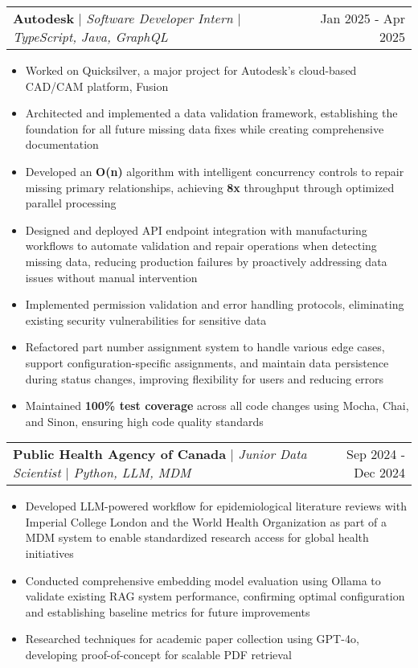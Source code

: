 \documentclass[letterpaper,10pt]{article}
\makeatletter
\newcommand{\resumeItem}[1]{
  \item\small{
    {#1 \vspace{-3.5pt}}
  }
}
\newcommand{\resumeSubheading}[3]{
    \item
    \begin{tabular*}{0.97\textwidth}[t]{l@{\extracolsep{\fill}}r}
      \textbf{#1} $|$ \textit{ #2} & #3 \\
    \end{tabular*}\vspace{-6pt}
}
\newcommand{\resumeItemListStart}{\begin{itemize}}
\newcommand{\resumeItemListEnd}{\end{itemize}\vspace{-5pt}}
\makeatother
\begin{document}
    \resumeSubheading{Autodesk}{Software Developer Intern $|$ TypeScript, Java, GraphQL}{Jan 2025 - Apr 2025}
        \resumeItemListStart
            \resumeItem{Worked on Quicksilver, a major project for Autodesk's cloud-based CAD/CAM platform, Fusion}
            \resumeItem{Architected and implemented a data validation framework, establishing the foundation for all future missing data fixes while creating comprehensive documentation}
            \resumeItem{Developed an \textbf{O(n)} algorithm with intelligent concurrency controls to repair missing primary relationships, achieving \textbf{8x} throughput through optimized parallel processing}
            \resumeItem{Designed and deployed API endpoint integration with manufacturing workflows to automate validation and repair operations when detecting missing data, reducing production failures by proactively addressing data issues without manual intervention}
            \resumeItem{Implemented permission validation and error handling protocols, eliminating existing security vulnerabilities for sensitive data}
            \resumeItem{Refactored part number assignment system to handle various edge cases, support configuration-specific assignments, and maintain data persistence during status changes, improving flexibility for users and reducing errors}
            \resumeItem{Maintained \textbf{100\% test coverage} across all code changes using Mocha, Chai, and Sinon, ensuring high code quality standards}
        \resumeItemListEnd

    \resumeSubheading{Public Health Agency of Canada}{Junior Data Scientist $|$ Python, LLM, MDM}{Sep 2024 - Dec 2024}
      \resumeItemListStart
        \resumeItem{Developed LLM-powered workflow for epidemiological literature reviews with Imperial College London and the World Health Organization as part of a MDM system to enable standardized research access for global health initiatives}
        \resumeItem{Conducted comprehensive embedding model evaluation using Ollama to validate existing RAG system performance, confirming optimal configuration and establishing baseline metrics for future improvements}
        \resumeItem{Researched techniques for academic paper collection using GPT-4o, developing proof-of-concept for scalable PDF retrieval}
      \resumeItemListEnd
\end{document}
